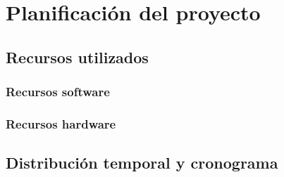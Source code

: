 \chapter{Planificación del proyecto}

\section{Recursos utilizados}

\subsection{Recursos software}

\subsection{Recursos hardware}

\section{Distribución temporal y cronograma}
